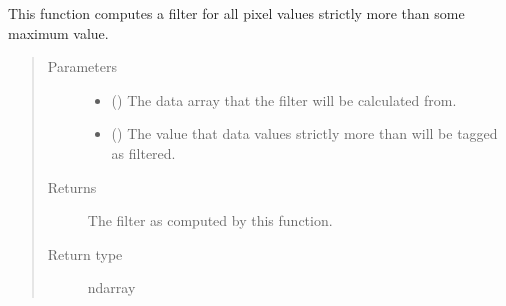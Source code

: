 \documentclass[letterpaper,10pt,english]{sphinxmanual}
\begin{document}
\begin{fulllineitems}
\label{\detokenize{docstrings/ifa_smeargle.masking.filters:ifa_smeargle.masking.filters.filter_maximum_value}}
This function computes a filter for all pixel values
strictly more than some maximum value.
\begin{quote}\begin{description}
\item[{Parameters}] \leavevmode\begin{itemize}
\item {} 
 () \textendash{} The data array that the filter will be calculated from.

\item {} 
 () \textendash{} The value that data values strictly more than will be
tagged as filtered.

\end{itemize}

\item[{Returns}] \leavevmode
{} \textendash{} The filter as computed by this function.

\item[{Return type}] \leavevmode
ndarray

\end{description}\end{quote}

\end{fulllineitems}

\end{document}
